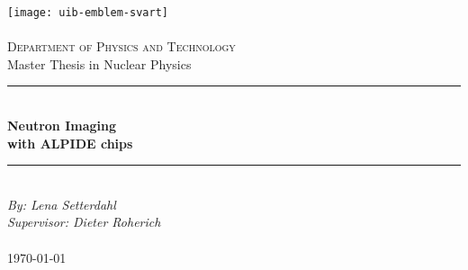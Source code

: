 \documentclass[12pt]{book}
\begin{document}
\newcommand{\blankpage}{\newpage{}\thispagestyle{empty}\mbox{}\newpage{}}
\newcommand{\HRule}{\rule{\linewidth}{0.5mm}}

\begin{titlepage}
\begin{center}
\texttt{[image: uib-emblem-svart]} \\[0.5cm]
\paragraph*{}


\textsc{\Large Department of Physics and Technology}\\[0.5cm]
\Large Master Thesis in Nuclear Physics \\[0.4cm]
\HRule \\[0.4cm]
{ \huge \bfseries Neutron Imaging \\ with ALPIDE chips}\\[0.5cm]  %
\HRule \\[1.0cm]



\emph{By: Lena Setterdahl}\\
\emph{Supervisor: Dieter Roherich}\\

\paragraph*{}
\end{center}
\vfill
\begin{center}
{\large \today}
\end{center}
\end{titlepage}


\ifDownscaledFinalDoc
	\fontsize{\TextSize}{\BaseLineSkip}
	\selectfont
\fi

\ifDraft
	\singlespacing
\fi

\renewcommand{\familydefault}{\sfdefault} %

\frontmatter
\normalfont\rmfamily
%
\end{document}
